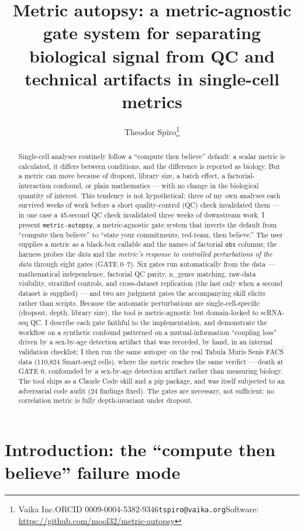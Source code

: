 \documentclass[
  11pt,
]{article}
\title{Metric autopsy: a metric-agnostic gate system for separating
biological signal from QC and technical artifacts in single-cell
metrics}
\author{Theodor
Spiro\thanks{Vaika Inc.\quad ORCID 0009-0004-5382-9346\quad \texttt{tspiro@vaika.org}\quad Software: \url{https://github.com/mool32/metric-autopsy}}}
\date{}
\begin{document}
\maketitle
\begin{abstract}
Single-cell analyses routinely follow a ``compute then believe''
default: a scalar metric is calculated, it differs between conditions,
and the difference is reported as biology. But a metric can move because
of dropout, library size, a batch effect, a factorial-interaction
confound, or plain mathematics --- with no change in the biological
quantity of interest. This tendency is not hypothetical: three of my own
analyses each survived weeks of work before a short quality-control (QC)
check invalidated them --- in one case a 45-second QC check invalidated
three weeks of downstream work. I present \texttt{metric-autopsy}, a
metric-agnostic gate system that inverts the default from ``compute then
believe'' to ``state your commitments, red-team, then believe.'' The
user supplies a metric as a black-box callable and the names of
factorial \texttt{obs} columns; the harness probes the \emph{data} and
the \emph{metric's response to controlled perturbations of the data}
through eight gates (GATE 0--7). Six gates run automatically from the
data --- mathematical independence, factorial QC parity, n\_genes
matching, raw-data visibility, stratified controls, and cross-dataset
replication (the last only when a second dataset is supplied) --- and
two are judgment gates the accompanying skill elicits rather than
scripts. Because the automatic perturbations are single-cell-specific
(dropout, depth, library size), the tool is metric-agnostic but
domain-locked to scRNA-seq QC. I describe each gate faithful to the
implementation, and demonstrate the workflow on a synthetic confound
patterned on a mutual-information ``coupling loss'' driven by a
sex-by-age detection artifact that was recorded, by hand, in an internal
validation checklist; I then run the same autopsy on the real Tabula
Muris Senis FACS data (110,824 Smart-seq2 cells), where the metric
reaches the same verdict --- death at GATE 0, confounded by a sex-by-age
detection artifact rather than measuring biology. The tool ships as a
Claude Code skill and a pip package, and was itself subjected to an
adversarial code audit (24 findings fixed). The gates are necessary, not
sufficient: no correlation metric is fully depth-invariant under
dropout.
\end{abstract}

\section{Introduction: the ``compute then believe'' failure
mode}\label{introduction-the-compute-then-believe-failure-mode}
\end{document}
